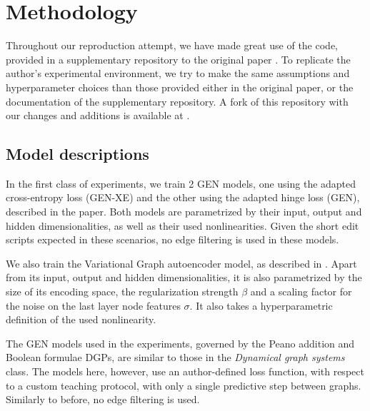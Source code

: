 
\section{Methodology}

Throughout our reproduction attempt, we have made great use of the code, provided in a supplementary repository to the original paper \cite{gitlab}. To replicate the author's experimental environment, we try to make the same assumptions and hyperparameter choices than those provided either in the original paper, or the documentation of the supplementary repository. A fork of this repository with our changes and additions is available at \cite{Git}.


\subsection{Model descriptions}
\label{subsec:models}
In the first class of experiments, we train 2 GEN models, one using the adapted cross-entropy loss (GEN-XE) and the other using the adapted hinge loss (GEN), described in the paper. Both models are parametrized by their input, output and hidden dimensionalities, as well as their used nonlinearities. Given the short edit scripts expected in these scenarios, no edge filtering is used in these models.

We also train the Variational Graph autoencoder model, as described in \cite{vgae}. Apart from its input, output and hidden dimensionalities, it is also parametrized by the size of its encoding space, the regularization strength $\beta$ and a scaling factor for the noise on the last layer node features $\sigma$. It also takes a hyperparametric definition of the used nonlinearity. 

The GEN models used in the experiments, governed by the Peano addition and Boolean formulae DGPs, are similar to those in the \textit{Dynamical graph systems} class. The models here, however, use an author-defined loss function, with respect to a custom teaching protocol, with only a single predictive step between graphs. Similarly to before, no edge filtering is used.


